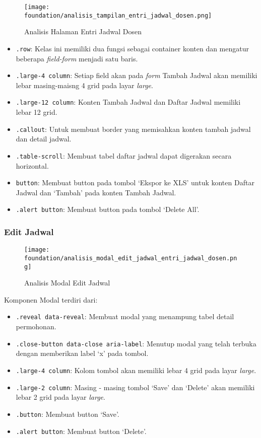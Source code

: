 \begin{figure} [H]
\centering  
\texttt{[image: foundation/analisis\_tampilan\_entri\_jadwal\_dosen.png]}
\caption{Analisis Halaman Entri Jadwal Dosen}
\end{figure}
\begin{itemize}
	\item \texttt{.row}: Kelas ini memiliki dua fungsi sebagai container konten dan mengatur beberapa \textit{field-form} menjadi satu baris. 
	\item \texttt{.large-4 column}: Setiap field akan pada \textit{form} Tambah Jadwal akan memiliki lebar masing-maisng 4 grid pada layar \textit{large}.
	\item \texttt{.large-12 column}: Konten Tambah Jadwal dan Daftar Jadwal memiliki lebar 12 grid.
	\item \texttt{.callout}: Untuk membuat border yang memisahkan konten tambah jadwal dan detail jadwal.
	\item \texttt{.table-scroll}: Membuat tabel daftar jadwal dapat digerakan secara horizontal.
	\item \texttt{button}: Membuat button pada tombol `Ekspor ke XLS' untuk konten Daftar Jadwal dan `Tambah' pada konten Tambah Jadwal.
	\item \texttt{.alert button}: Membuat button pada tombol `Delete All'.
	
\end{itemize}
\subsubsection{Edit Jadwal}
\begin{figure} [H]
\centering  
\texttt{[image: foundation/analisis\_modal\_edit\_jadwal\_entri\_jadwal\_dosen.png]}
\caption{Analisis Modal Edit Jadwal}
\end{figure}
Komponen Modal terdiri dari:
\begin{itemize}
	\item \texttt{.reveal data-reveal}: Membuat modal yang menampung tabel detail permohonan.
	\item \texttt{.close-button data-close aria-label}: Menutup modal yang telah terbuka dengan memberikan label `x' pada tombol.
	\item \texttt{.large-4 column}: Kolom tombol akan memiliki lebar 4 grid pada layar \textit{large}.
	\item \texttt{.large-2 column}: Masing - masing tombol `Save' dan `Delete' akan memiliki lebar 2 grid pada layar \textit{large}.
	\item \texttt{.button}: Membuat button `Save'.
	\item \texttt{.alert button}: Membuat button `Delete'.
\end{itemize}

